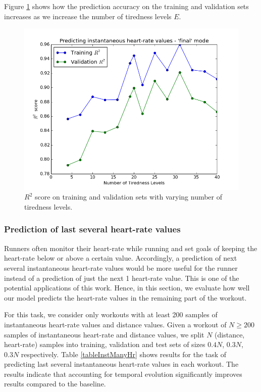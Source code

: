\documentclass{acm_proc_article-sp}
\begin{document}
Figure \ref{figR2vsTirednessLevels} shows how the prediction accuracy on the training and validation sets increases as we increase the number of tiredness levels $E$. 

\begin{figure}[h]
\centering
\includegraphics[scale=0.4]{../src/plots/r2_vs_num_tiredness_levels}
\caption{\label{figR2vsTirednessLevels} $R^2$ score on training and validation sets with varying number of tiredness levels.}
\end{figure}

\subsubsection{Prediction of last several heart-rate values}
Runners often monitor their heart-rate while running and set goals of keeping the heart-rate below or above a certain value. Accordingly, a prediction of next several instantaneous heart-rate values would be more useful for the runner instead of a prediction of just the next 1 heart-rate value. This is one of the potential applications of this work. Hence, in this section, we evaluate how well our model predicts the heart-rate values in the remaining part of the workout.

For this task, we consider only workouts with at least 200 samples of instantaneous heart-rate values and distance values. Given a workout of $N \geq 200$ samples of instantaneous heart-rate and distance values, we split $N$ (distance, heart-rate) samples into training, validation and test sets of sizes $0.4N$, $0.3N$, $0.3N$ respectively. Table \ref{tableInstManyHr} shows results for the task of predicting last several instantaneous heart-rate values in each workout. The results indicate that accounting for temporal evolution significantly improves results compared to the baseline. 
\end{document}
